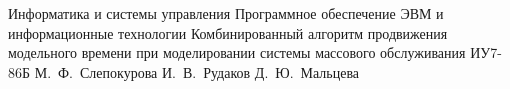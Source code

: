 \documentclass{bmstu}
\begin{document}
	\def\labelitemi{---}
	
	
	\makethesistitle
	{Информатика и системы управления}
	{Программное обеспечение ЭВМ и информационные технологии}
	{Комбинированный алгоритм продвижения модельного времени при моделировании системы массового обслуживания}
	{ИУ7-86Б}
	{М.~Ф.~Слепокурова} %
	{И.~В.~Рудаков} %
	{}
	{}
	{Д.~Ю.~Мальцева} %
	
	\setcounter{page}{5}
	
	
	\maketableofcontents
	
	
	
	
	
	
	
	\makebibliography
	
	
\end{document}
